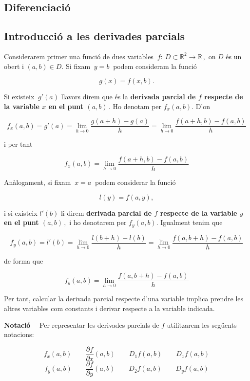 \documentclass[12pt]{article}
\newcommand{\notacio}{\textbf{Notaci{\'o}}\ \ }
\newcommand{\R}{\mathbb{R}}
\begin{document}
\parskip =0.3cm
\parindent =0cm
\itemindent=2cm


\vspace{0.4cm}\begin{center}
\section{Diferenciaci{\'o}}
\end{center}


\vspace*{0.7cm}
\subsection{Introducci{\'o} a les derivades parcials}

Considerarem primer una funci{\'o} de dues variables $\ f:\
D\subset \R^{2} \longrightarrow \R\,,$ on $D$ {\'e}s un obert
i $(a,b) \in D$. Si fixam $\ y=b\ $ podem consideram la funci{\'o}

\[
g(x)= f(x,b).
\]

Si  existeix $\ g'(a)$ llavors direm que {\'e}s la \textbf{derivada parcial de $f$
respecte de la variable $x$ en el punt $(a,b)\,.$} Ho denotam per
$f_{x}(a,b)$. D'on

\[
f_{x}(a,b) = g'(a) = \lim_{h\to 0} \frac{g(a+h)-g(a)}{h} =
\lim_{h\to 0} \frac{f(a+h,b)-f(a,b)}{h}
\]

i per tant

\[
f_{x}(a,b) = \lim_{h\to 0} \frac{f(a+h,b)-f(a,b)}{h}
\]

An{\`a}logament, si fixam $\ x=a\ $  podem considerar la funci{\'o}

\[
l(y)=f(a,y),
\]

i si existeix $l'(b)$ li direm \textbf{derivada parcial de $f$
respecte de la variable $y$ en el punt $(a,b)\,,$} i ho
denotarem per $f_{y}(a,b)$. Igualment tenim que

\[
f_{y}(a,b)=l'(b)=\lim_{h\to 0} \frac{l(b+h)-l(b)}{h}
=
\lim_{h\to 0} \frac{f(a,b+h)-f(a,b)}{h}
\]

de forma que

\[
f_{y}(a,b)=\lim_{h\to 0} \frac{f(a,b+h)-f(a,b)}{h}
\]

Per tant, calcular la derivada parcial respecte d'una variable
implica prendre les altres variables com constants i derivar respecte a la variable indicada.

\notacio
Per representar les derivades parcials de $f$
utilitzarem les seg{\"u}ents notacions:

\[
f_{x}(a,b)\qquad\frac{\partial f}{\partial x}(a,b)\qquad
D_{1}f(a,b)\qquad D_{x}f(a,b)
\]
\[
f_y(a,b)\qquad \frac{\partial f}{\partial y}(a,b) \qquad D_2 f(a,b)\qquad D_y
f(a,b)
\]
\end{document}
